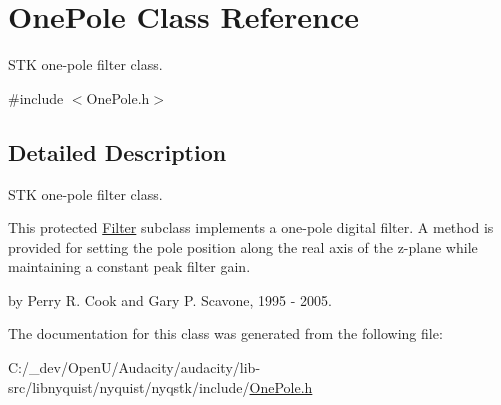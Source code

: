 \hypertarget{class_one_pole}{}\section{One\+Pole Class Reference}
\label{class_one_pole}


S\+TK one-\/pole filter class.  




{\ttfamily \#include $<$One\+Pole.\+h$>$}



\subsection{Detailed Description}
S\+TK one-\/pole filter class. 

This protected \hyperlink{class_filter}{Filter} subclass implements a one-\/pole digital filter. A method is provided for setting the pole position along the real axis of the z-\/plane while maintaining a constant peak filter gain.

by Perry R. Cook and Gary P. Scavone, 1995 -\/ 2005. 

The documentation for this class was generated from the following file\+:\begin{DoxyCompactItemize}
\item 
C\+:/\+\_\+dev/\+Open\+U/\+Audacity/audacity/lib-\/src/libnyquist/nyquist/nyqstk/include/\hyperlink{_one_pole_8h}{One\+Pole.\+h}\end{DoxyCompactItemize}
